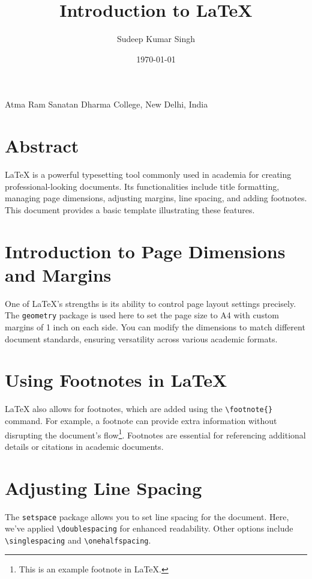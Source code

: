 \documentclass[12pt]{article} %
\title{Introduction to LaTeX}
\author{Sudeep Kumar Singh}
\date{\today}
\begin{document}
\maketitle

\begin{center}
    Atma Ram Sanatan Dharma College, New Delhi, India
\end{center}

\section*{Abstract}
LaTeX is a powerful typesetting tool commonly used in academia for creating professional-looking documents. Its functionalities include title formatting, managing page dimensions, adjusting margins, line spacing, and adding footnotes. This document provides a basic template illustrating these features.

\section{Introduction to Page Dimensions and Margins}
One of LaTeX's strengths is its ability to control page layout settings precisely. The \texttt{geometry} package is used here to set the page size to A4 with custom margins of 1 inch on each side. You can modify the dimensions to match different document standards, ensuring versatility across various academic formats.

\section{Using Footnotes in LaTeX}
LaTeX also allows for footnotes, which are added using the \texttt{\textbackslash footnote\{\}} command. For example, a footnote can provide extra information without disrupting the document's flow\footnote{This is an example footnote in LaTeX.}. Footnotes are essential for referencing additional details or citations in academic documents.

\section{Adjusting Line Spacing}
The \texttt{setspace} package allows you to set line spacing for the document. Here, we've applied \texttt{\textbackslash doublespacing} for enhanced readability. Other options include \texttt{\textbackslash singlespacing} and \texttt{\textbackslash onehalfspacing}.
\end{document}
